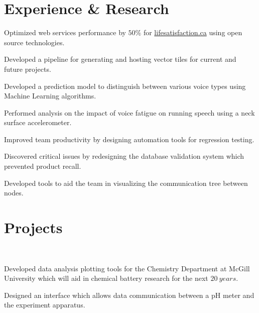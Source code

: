 \documentclass[]{sumbal-resume}
\begin{document}
\section{Experience \& Research}

\vspace{\topsep}
\begin{tightemize}
\item Optimized web services performance by $50 \%$ for \href{http://lifesatisfaction.ca}{lifesatisfaction.ca} using open source technologies.
\item Developed a pipeline for generating and hosting vector tiles for current and future projects.
\end{tightemize}


\begin{tightemize}
\item Developed a prediction model to distinguish between various voice types using Machine Learning algorithms. 
\item Performed analysis on the impact of voice fatigue on running speech using a neck surface accelerometer.
\end{tightemize}


\begin{tightemize}
\item Improved team productivity by designing automation tools for regression testing. 
\item Discovered critical issues by redesigning the database validation system which prevented product recall.
\item Developed tools to aid the team in visualizing the communication tree between nodes.
\end{tightemize}

\sectionsep
\section{Projects}

 \\
\begin{tightemize}
\item Developed data analysis plotting tools for the Chemistry Department at McGill University which will aid in chemical battery research for the next $20 \ years$. 
\item Designed an interface which allows data communication between a pH meter and the experiment apparatus. 
\end{tightemize}
\end{document}
